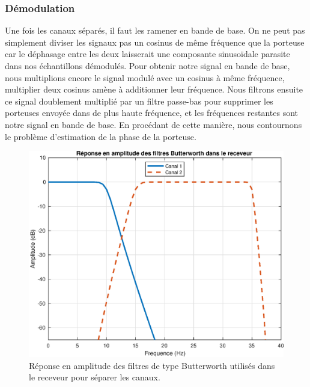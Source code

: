 \documentclass[10pt, oneside, a4paper]{article}
\begin{document}
\subsubsection{Démodulation}
Une fois les canaux séparés, il faut les ramener en bande de base.
On ne peut pas simplement diviser les signaux pas un cosinus de même fréquence que la porteuse car le déphasage entre les deux laisserait une composante sinusoïdale parasite dans nos échantillons démodulés.
Pour obtenir notre signal en bande de base, nous multiplions encore le signal modulé avec un cosinus à même fréquence, multiplier deux cosinus amène à additionner leur fréquence.
Nous filtrons ensuite ce signal doublement multiplié par un filtre passe-bas pour supprimer les porteuses envoyée dans de plus haute fréquence, et les fréquences restantes sont notre signal en bande de base.
En procédant de cette manière, nous contournons le problème d'estimation de la phase de la porteuse.

\begin{figure}[p]
    \centering
    \includegraphics[height=0.4\textheight]{eps/filters.eps}
    \caption{Réponse en amplitude des filtres de type Butterworth utilisés dans le receveur
             pour séparer les canaux.}
    \label{fig:filters}
\end{figure}
\end{document}
